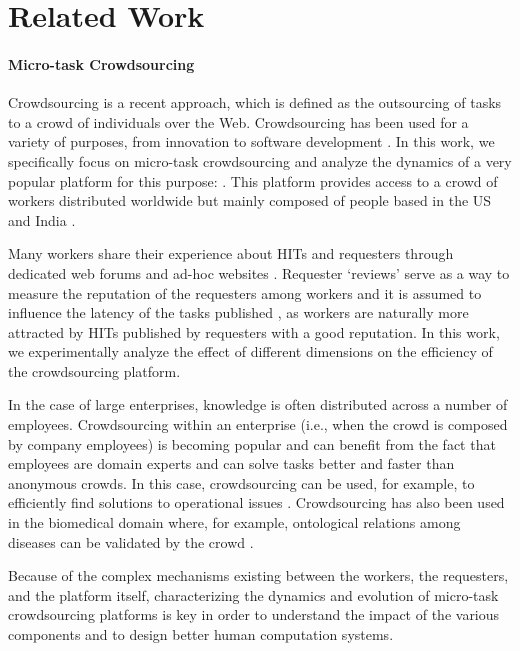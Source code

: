 \section{Related Work}\label{sec:relwork}

\paragraph{Micro-task Crowdsourcing}
Crowdsourcing is a recent approach, which is defined as the  outsourcing of tasks  to a crowd of individuals over the Web. Crowdsourcing has  been used for a variety of purposes, from innovation to software development \cite{platforms}.
% 
In this work, we specifically focus on micro-task crowdsourcing and analyze the dynamics of a  very popular  platform for this purpose: \amt{}. This platform provides access to a crowd of workers distributed worldwide but mainly composed of people based in the US and India \cite{mturk}.

Many \amt{} workers share their experience about HITs and requesters through dedicated web forums and ad-hoc websites \cite{turkopticon}. Requester `reviews' serve as a way to measure the reputation of the requesters among workers and it is assumed to influence the latency of the tasks published \cite{TOreputation}, as workers are naturally more attracted by HITs published by  requesters with a good reputation.
% 
In this work, we experimentally analyze the effect of different dimensions on the efficiency of the crowdsourcing platform.

In the case of large enterprises,  knowledge is often distributed across a number of employees. Crowdsourcing within an enterprise (i.e., when the crowd is composed by company employees) is  becoming popular and can benefit from the fact that employees are domain experts and can solve tasks better and faster than anonymous crowds. In this case, crowdsourcing can be used, for example, to efficiently find solutions to operational issues  \cite{enterprisecrowdsourcing}. 
% 
Crowdsourcing has also been used in the biomedical domain where, for example,  ontological relations among diseases can be validated by the crowd \cite{bioonto,biomedical}.

Because of the complex mechanisms existing between the workers, the requesters, and the platform itself, characterizing the dynamics and evolution of micro-task crowdsourcing platforms is key in order to understand the impact of the various components and to design better human computation systems.

